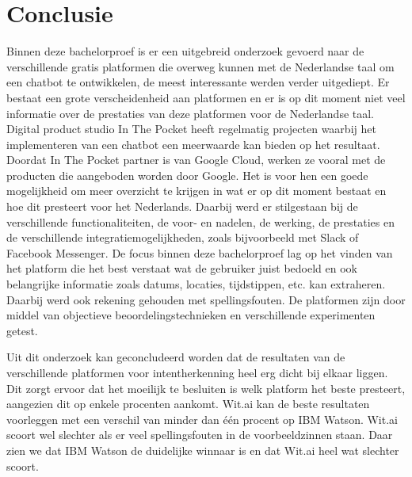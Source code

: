
\chapter{Conclusie}
\label{ch:conclusie}


Binnen deze bachelorproef is er een uitgebreid onderzoek gevoerd naar de verschillende gratis platformen die overweg kunnen met de Nederlandse taal om een chatbot te ontwikkelen, de meest interessante werden verder uitgediept. Er bestaat een grote verscheidenheid aan platformen en er is op dit moment niet veel informatie over de prestaties van deze platformen voor de Nederlandse taal. Digital product studio In The Pocket heeft regelmatig projecten waarbij het implementeren van een chatbot een meerwaarde kan bieden op het resultaat. Doordat In The Pocket
partner is van Google Cloud, werken ze vooral met de producten die aangeboden worden door Google. Het is voor hen een goede mogelijkheid om meer overzicht te krijgen in wat er op dit moment bestaat en hoe dit presteert voor het Nederlands. Daarbij werd er stilgestaan bij de verschillende functionaliteiten, de voor- en nadelen, de werking, de prestaties en de verschillende integratiemogelijkheden, zoals bijvoorbeeld met Slack of Facebook Messenger. De focus binnen deze bachelorproef lag op het vinden van het platform die het best verstaat wat de gebruiker juist bedoeld en ook belangrijke informatie zoals datums, locaties, tijdstippen, etc. kan extraheren. Daarbij werd ook rekening gehouden met spellingsfouten. De platformen zijn door middel van objectieve beoordelingstechnieken en verschillende experimenten getest.

Uit dit onderzoek kan geconcludeerd worden dat de resultaten van de verschillende platformen voor intentherkenning heel erg dicht bij elkaar liggen. Dit zorgt ervoor dat het moeilijk te besluiten is welk platform het beste presteert, aangezien dit op enkele procenten aankomt. Wit.ai kan de beste resultaten voorleggen met een verschil van minder dan één procent op IBM Watson. Wit.ai scoort wel slechter als er veel spellingsfouten in de voorbeeldzinnen staan. Daar zien we dat IBM Watson de duidelijke winnaar is en dat Wit.ai heel wat slechter scoort.

